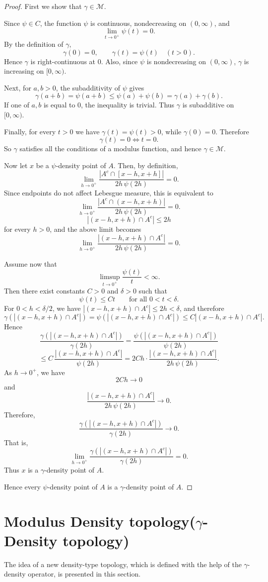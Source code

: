 \documentclass{amsart}
\theoremstyle{plain}
\numberwithin{equation}{section}
\begin{document}
\begin{proof}
First we show that $\gamma \in \mathcal{M}$.

Since $\psi \in C$, the function $\psi$ is continuous, nondecreasing on $(0,\infty)$, and
$$
\lim_{t\to 0^+}\psi(t)=0.
$$
By the definition of $\gamma$,
$$
\gamma(0)=0,\qquad \gamma(t)=\psi(t)\quad (t>0).
$$
Hence $\gamma$ is right-continuous at $0$. Also, since $\psi$ is nondecreasing on $(0,\infty)$, $\gamma$ is increasing on $[0,\infty)$.

Next, for $a,b>0$, the subadditivity of $\psi$ gives
$$
\gamma(a+b)=\psi(a+b)\le \psi(a)+\psi(b)=\gamma(a)+\gamma(b).
$$
If one of $a,b$ is equal to $0$, the inequality is trivial. Thus $\gamma$ is subadditive on $[0,\infty)$.

Finally, for every $t>0$ we have $\gamma(t)=\psi(t)>0$, while $\gamma(0)=0$. Therefore
$$
\gamma(t)=0 \iff t=0.
$$
So $\gamma$ satisfies all the conditions of a modulus function, and hence $\gamma \in \mathcal{M}$.

Now let $x$ be a $\psi$-density point of $A$. Then, by definition,
$$
\lim_{h\to 0^+}\frac{|A^c\cap [x-h,x+h]|}{2h\,\psi(2h)}=0.
$$
Since endpoints do not affect Lebesgue measure, this is equivalent to
$$
\lim_{h\to 0^+}\frac{|A^c\cap (x-h,x+h)|}{2h\,\psi(2h)}=0.
$$
$$
|(x-h,x+h)\cap A^c|\le 2h
$$
for every $h>0$, and the above limit becomes
$$
\lim_{h\to 0^+}\frac{|(x-h,x+h)\cap A^c|}{2h\,\psi(2h)}=0.
$$

Assume now that
$$
\limsup_{t\to 0^+}\frac{\psi(t)}{t}<\infty.
$$
Then there exist constants $C>0$ and $\delta>0$ such that
$$
\psi(t)\le Ct \qquad \text{for all } 0<t<\delta.
$$
For $0<h<\delta/2$, we have $|(x-h,x+h)\cap A^c|\le 2h<\delta$, and therefore
$$
\gamma(|(x-h,x+h)\cap A^c|)=\psi(|(x-h,x+h)\cap A^c|)\le C|(x-h,x+h)\cap A^c|.
$$
Hence
$$
\frac{\gamma(|(x-h,x+h)\cap A^c|)}{\gamma(2h)}
=
\frac{\psi(|(x-h,x+h)\cap A^c|)}{\psi(2h)}
$$ $$ \le 
C\,\frac{|(x-h,x+h)\cap A^c|}{\psi(2h)}
=
2Ch\cdot \frac{|(x-h,x+h)\cap A^c|}{2h\,\psi(2h)}.
$$
As $h\to 0^+$, we have
$$
2Ch\to 0
$$
and
$$
\frac{|(x-h,x+h)\cap A^c|}{2h\,\psi(2h)}\to 0.
$$
Therefore,
$$
\frac{\gamma(|(x-h,x+h)\cap A^c|)}{\gamma(2h)}\to 0.
$$
That is,
$$
\lim_{h\to 0^+}\frac{\gamma(|(x-h,x+h)\cap A^c|)}{\gamma(2h)}=0.
$$
Thus $x$ is a $\gamma$-density point of $A$.

Hence every $\psi$-density point of $A$ is a $\gamma$-density point of $A$.
\end{proof}

\section{Modulus Density topology($\gamma$-Density topology)}
The idea of a new density-type topology, which is defined with the help of the $\gamma$-density operator, is presented in this section.
\end{document}
